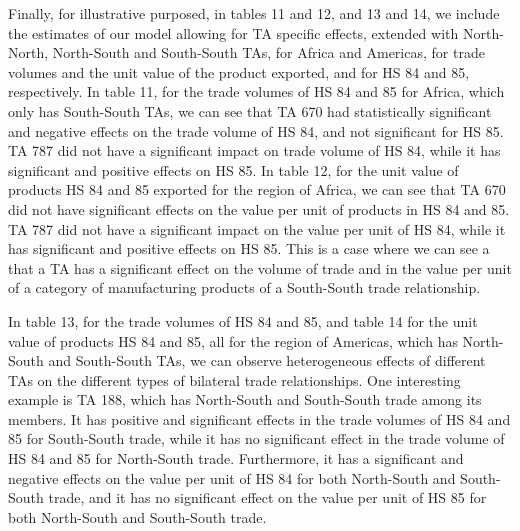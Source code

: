 \documentclass[12pt]{article}%
\begin{document}
Finally, for illustrative purposed, in tables 11 and 12, and 13 and 14,
we include the estimates of our model allowing for TA specific effects,
extended with North-North, North-South and South-South TAs, for Africa
and Americas, for trade volumes and the unit value of the product
exported, and for HS 84 and 85, respectively. In table 11, for the trade
volumes of HS 84 and 85 for Africa, which only has South-South TAs, we
can see that TA 670 had statistically significant and negative effects
on the trade volume of HS 84, and not significant for HS 85. TA 787 did
not have a significant impact on trade volume of HS 84, while it has
significant and positive effects on HS 85. In table 12, for the unit
value of products HS 84 and 85 exported for the region of Africa, we can
see that TA 670 did not have significant effects on the value per unit
of products in HS 84 and 85. TA 787 did not have a significant impact on
the value per unit of HS 84, while it has significant and positive
effects on HS 85. This is a case where we can see a that a TA has a
significant effect on the volume of trade and in the value per unit of a
category of manufacturing products of a South-South trade relationship.

In table 13, for the trade volumes of HS 84 and 85, and table 14 for the
unit value of products HS 84 and 85, all for the region of Americas,
which has North-South and South-South TAs, we can observe heterogeneous
effects of different TAs on the different types of bilateral trade
relationships. One interesting example is TA 188, which has North-South
and South-South trade among its members. It has positive and significant
effects in the trade volumes of HS 84 and 85 for South-South trade,
while it has no significant effect in the trade volume of HS 84 and 85
for North-South trade. Furthermore, it has a significant and negative
effects on the value per unit of HS 84 for both North-South and
South-South trade, and it has no significant effect on the value per
unit of HS 85 for both North-South and South-South trade.
%
%
%
%
%
%
%
%
%
%
%
%
%
\FloatBarrier

%
\end{document}
